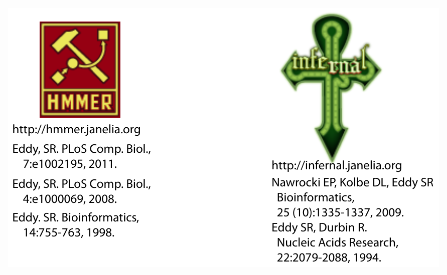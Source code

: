 \documentclass[landscape]{slides}
\begin{document}
\begin{slide}
\begin{center}
\hspace{1.2in}\includegraphics[height=2.7in]{figs/hmmer-infernal-refs}

\end{center}

\vfill

\end{slide}
\end{document}
